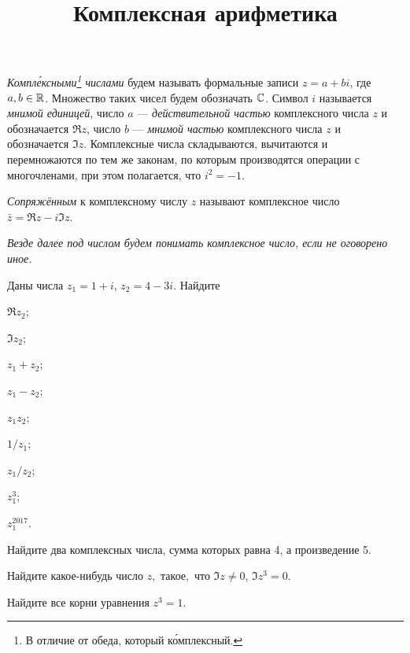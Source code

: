 \documentclass[a4paper, 12pt, num=21]{listok}
\begin{document}
\title{Комплексная арифметика}
\maketitle{}
\begin{definition}
	\textit{Компл\'ексными\footnote{В отличие от обеда, который к\'омплексный.} числами} будем называть формальные записи $z = a + b i$, где $a, b \in \mathbb{R}$.
	Множество таких чисел будем обозначать $\mathbb{C}$.
	Символ $i$ называется \textit{мнимой единицей}, число $a$ --- \textit{действительной частью} комплексного числа $z$ и обозначается $\Re z$,
	число $b$ --- \textit{мнимой частью} комплексного числа $z$ и обозначается $\Im z$.
	Комплексные числа складываются, вычитаются и перемножаются по тем же законам, по которым производятся операции с
	многочленами, при этом полагается, что $i^2 = -1$.
\end{definition}
\begin{definition}
	\textit{Сопряжённым} к комплексному числу $z$ называют комплексное число $\bar{z} = \Re z - i \Im z$.
\end{definition}
\textit{Везде далее под числом будем понимать комплексное число, если не оговорено иное.}
\begin{problem}
Даны числа $z_1 = 1 + i$, $z_2 = 4 - 3i$.
Найдите
\begin{multienum}{5}
	\item $\Re z_2$;
	\item $\Im z_2$;
	\item $z_1 + z_2$;
	\item $z_1 - z_2$;
	\item $z_1z_2$;
	\item $1/z_1$;
	\item $z_1/z_2$;
	\item $z_1^3$;
	\item $z_1^{2017}$.
\end{multienum}
\end{problem}
\begin{problem}
	Найдите два комплексных числа, сумма которых равна 4, а произведение 5.
\end{problem}
\begin{problem}
\begin{probparts}
	\item Найдите какое-нибудь число $z$,~такое,~что $\Im z \ne 0$, $\Im z^3 = 0$.
	\item Найдите все корни уравнения $z^3 = 1$.
\end{probparts}
\end{problem}
\end{document}
